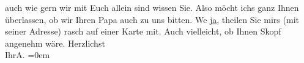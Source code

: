 \begin{ledgroupsized}[t]{13cm}
               auch wie gern wir mit Euch allein sind wissen Sie. Also möcht ichs ganz Ihnen
               überlassen, ob wir {\pb}Ihren Papa auch zu uns bitten. We{\geminationn}{ }\uline{ja}, theilen Sie mirs (mit seiner Adresse) rasch auf
               einer Karte mit. Auch vielleicht, ob Ihnen Skopf angenehm wäre.\pend
           \pstart
           Herzlichst{\\[\baselineskip]}Ihr\spacefill\mbox{A.}\pend
           \leftskip=0em{}
         
         \endnumbering{}\end{ledgroupsized}  \newcommand{\dateiname}{L01731}\newcommand{\titel}{Arthur Schnitzler an Hugo von Hofmannsthal, 15. 11. [1907]}\newcommand{\editorInnen}{Martin Anton Müller und Gerd-Hermann Susen}
      